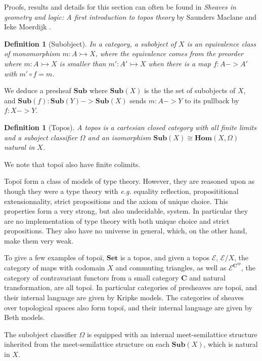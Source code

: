 \documentclass[11pt]{article}
\newtheorem{definition}[theorem]{Definition}
\newcommand{\0}{\mathbf{0}}
\newcommand{\1}{\mathbf{1}}
\newcommand{\mono}{\rightarrowtail}
\begin{document}
Proofs, results and details for this section can often be found in \emph{Sheaves in geometry and logic: A first introduction to topos theory} by Saunders Maclane and Ieke Moerdijk \cite{maclane2012sheaves}.

\begin{definition}[Subobject]
    In a category, a \emph{subobject} of $X$ is an equivalence class of monomorphism $m : A \mono X$, where the equivalence comes from the preorder where $ m : A \mono X $ is smaller than $ m' : A' \mono X$ when there is a map $f : A -> A'$ with $ m' \circ f = m$.
\end{definition}

We deduce a presheaf $\mathbf{Sub}$ where $\mathbf{Sub}(X)$ is the the set of subobjects of $X$, and $\mathbf{Sub}(f) : \mathbf{Sub}(Y) -> \mathbf{Sub}(X)$ sends $m : A -> Y$ to its pullback by $f : X -> Y $. 

\begin{definition}[Topos]\label{topos}
    A \emph{topos} is a cartesian closed category with all finite limits and a suboject \emph{classifier} $\Omega$ and an isomorphism $\mathbf{Sub}(X)\cong \mathbf{Hom}(X, \Omega)$ natural in $X$.
\end{definition}

We note that topoï also have finite colimits.

Topoï form a class of models of type theory.
However, they are reasoned upon as though they were a type theory with \emph{e.g.} equality reflection, proposititional extensionnality, strict propositions and the axiom of unique choice. This properties form a very strong, but also undecidable, system. In particular they are no implementation of type theory with both unique choice and strict propositions. They also have no universe in general, which, on the other hand, make them very weak.


To give a few examples of topoï, $\mathbf{Set}$ is a topos, and given a topos $\mathcal E$, $\mathcal{E}/X$, the category of maps with codomain $X$ and commuting triangles, as well as $\mathcal{E}^{\mathbf{C}^{op}}$, the category of contravariant functors from a small category $\mathbf{C}$ and natural transformation, are all topoï. In particular categories of presheaves are topoï, and their internal language are given by Kripke models. The categories of sheaves over topological spaces also form topoï, and their internal language are given by Beth models.

The subobject classifier $\Omega$ is equipped with an internal meet-semilattice structure inherited from the meet-semilattice structure on each $\mathbf{Sub}(X)$, which is natural in $X$.
\end{document}
